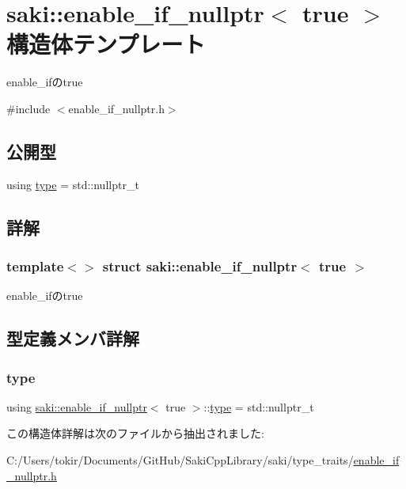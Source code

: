 \hypertarget{structsaki_1_1enable__if__nullptr_3_01true_01_4}{}\section{saki\+:\+:enable\+\_\+if\+\_\+nullptr$<$ true $>$ 構造体テンプレート}
\label{structsaki_1_1enable__if__nullptr_3_01true_01_4}


enable\+\_\+ifのtrue  




{\ttfamily \#include $<$enable\+\_\+if\+\_\+nullptr.\+h$>$}

\subsection*{公開型}
\begin{DoxyCompactItemize}
\item 
using \mbox{\hyperlink{structsaki_1_1enable__if__nullptr_3_01true_01_4_a8f1b04372e036f2c7a60c7df41a02e50}{type}} = std\+::nullptr\+\_\+t
\end{DoxyCompactItemize}


\subsection{詳解}
\subsubsection*{template$<$$>$\newline
struct saki\+::enable\+\_\+if\+\_\+nullptr$<$ true $>$}

enable\+\_\+ifのtrue 

\subsection{型定義メンバ詳解}
\mbox{\label{structsaki_1_1enable__if__nullptr_3_01true_01_4_a8f1b04372e036f2c7a60c7df41a02e50}} 
\subsubsection{\texorpdfstring{type}{type}}
{\footnotesize\ttfamily using \mbox{\hyperlink{structsaki_1_1enable__if__nullptr}{saki\+::enable\+\_\+if\+\_\+nullptr}}$<$ true $>$\+::\mbox{\hyperlink{structsaki_1_1enable__if__nullptr_3_01true_01_4_a8f1b04372e036f2c7a60c7df41a02e50}{type}} =  std\+::nullptr\+\_\+t}



この構造体詳解は次のファイルから抽出されました\+:\begin{DoxyCompactItemize}
\item 
C\+:/\+Users/tokir/\+Documents/\+Git\+Hub/\+Saki\+Cpp\+Library/saki/type\+\_\+traits/\mbox{\hyperlink{enable__if__nullptr_8h}{enable\+\_\+if\+\_\+nullptr.\+h}}\end{DoxyCompactItemize}
